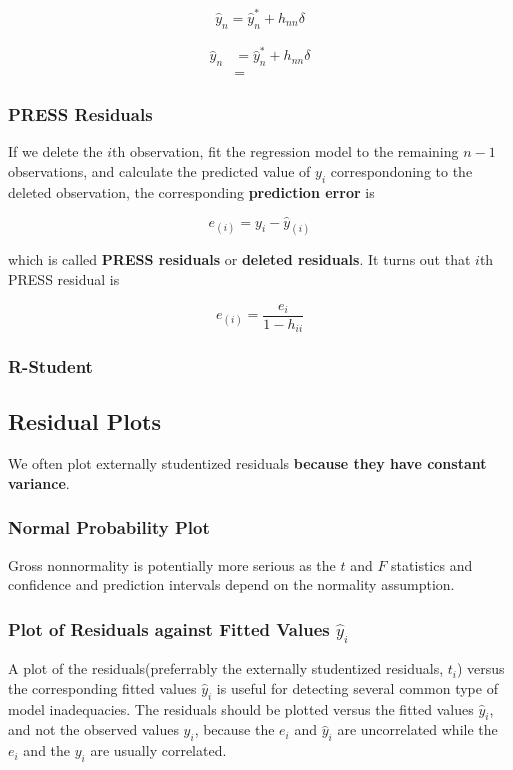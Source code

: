 \documentclass[12pt]{article}
\begin{document}
$$
\hat{y}_n = \hat{y}_n^\ast + h_{nn} \delta 
$$



$$
\begin{aligned}
\hat{y}_n &= \hat{y}_n^\ast + h_{nn} \delta \\[8pt]
&= 
\end{aligned}
$$


\subsubsection*{PRESS Residuals}

If we delete the $i$th observation, fit the regression model to the remaining $n-1$ observations, and calculate the predicted value of $y_i$ correspondoning to the deleted observation, the corresponding \textbf{prediction error} is 

$$
e_{(i)} = y_i - \hat{y}_{(i)}
$$

which is called \textbf{PRESS residuals} or \textbf{deleted residuals}. It turns out that $i$th PRESS residual is

$$
e_{(i)} = \frac{e_i}{1-h_{ii}}
$$



\subsubsection*{R-Student}





\subsection{Residual Plots}

We often plot externally studentized residuals \textbf{because they have constant variance}. 

\subsubsection*{Normal Probability Plot}
Gross nonnormality is potentially more serious as the $t$ and $F$ statistics and confidence and prediction intervals depend on the normality assumption. 


\subsubsection*{Plot of Residuals against Fitted Values $\hat{y}_i$}
A  plot of the residuals(preferrably the externally studentized residuals, $t_i$) versus the corresponding fitted values $\hat{y}_i$ is useful for detecting several common type of model inadequacies. The residuals should be plotted versus the fitted values $\hat{y}_i$, and not the observed values $y_i$, because the $e_i$ and $\hat{y}_i$ are uncorrelated while the $e_i$ and the $y_i$ are usually correlated. 
\end{document}
